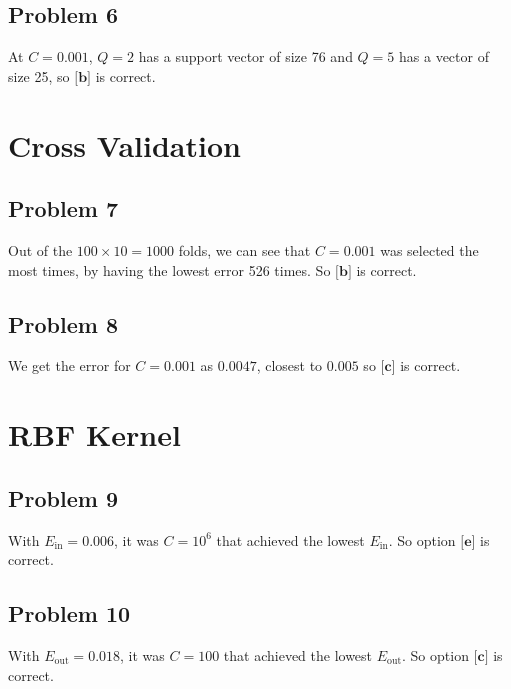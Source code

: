 \documentclass{article}
\begin{document}
\subsection*{Problem 6}
At $C = 0.001$, $Q = 2$ has a support vector of size 76 and $Q = 5$ has a vector of size 25, so $\textbf{[b]}$ is correct.
\newpage
\section*{Cross Validation}
\subsection*{Problem 7}
Out of the $100 \times 10 = 1000$ folds, we can see that $C = 0.001$ was selected the most times, by having the lowest error 526 times. So $\textbf{[b]}$ is correct.
\subsection*{Problem 8}
We get the error for $C = 0.001$ as $0.0047$, closest to $0.005$ so $\textbf{[c]}$ is correct.
\section*{RBF Kernel}
\subsection*{Problem 9}
With $E_{\text{in}} = 0.006$, it was $C = 10^6$ that achieved the lowest $E_{\text{in}}$. So option $\textbf{[e]}$ is correct.
\subsection*{Problem 10}
With $E_{\text{out}} = 0.018$, it was $C = 100$ that achieved the lowest $E_{\text{out}}$. So option $\textbf{[c]}$ is correct.

\end{document}
